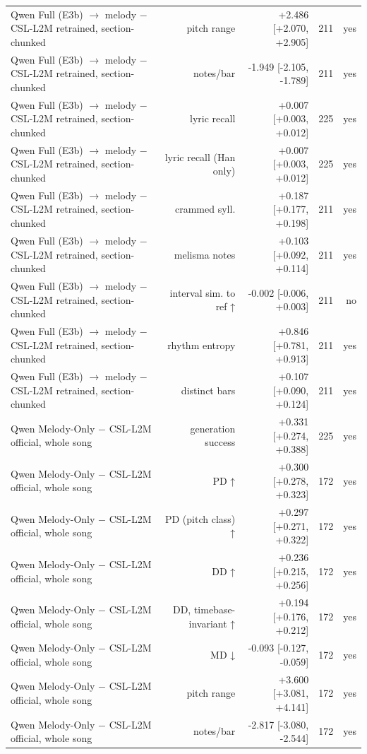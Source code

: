 \begin{table}[t]
\begin{tabular}{lrrrr}
Qwen Full (E3b) $\rightarrow$ melody $-$ CSL-L2M retrained, section-chunked & pitch range & +2.486 [+2.070, +2.905] & 211 & yes \\
Qwen Full (E3b) $\rightarrow$ melody $-$ CSL-L2M retrained, section-chunked & notes/bar & -1.949 [-2.105, -1.789] & 211 & yes \\
Qwen Full (E3b) $\rightarrow$ melody $-$ CSL-L2M retrained, section-chunked & lyric recall & +0.007 [+0.003, +0.012] & 225 & yes \\
Qwen Full (E3b) $\rightarrow$ melody $-$ CSL-L2M retrained, section-chunked & lyric recall (Han only) & +0.007 [+0.003, +0.012] & 225 & yes \\
Qwen Full (E3b) $\rightarrow$ melody $-$ CSL-L2M retrained, section-chunked & crammed syll. & +0.187 [+0.177, +0.198] & 211 & yes \\
Qwen Full (E3b) $\rightarrow$ melody $-$ CSL-L2M retrained, section-chunked & melisma notes & +0.103 [+0.092, +0.114] & 211 & yes \\
Qwen Full (E3b) $\rightarrow$ melody $-$ CSL-L2M retrained, section-chunked & interval sim. to ref ↑ & -0.002 [-0.006, +0.003] & 211 & no \\
Qwen Full (E3b) $\rightarrow$ melody $-$ CSL-L2M retrained, section-chunked & rhythm entropy & +0.846 [+0.781, +0.913] & 211 & yes \\
Qwen Full (E3b) $\rightarrow$ melody $-$ CSL-L2M retrained, section-chunked & distinct bars & +0.107 [+0.090, +0.124] & 211 & yes \\
Qwen Melody-Only $-$ CSL-L2M official, whole song & generation success & +0.331 [+0.274, +0.388] & 225 & yes \\
Qwen Melody-Only $-$ CSL-L2M official, whole song & PD ↑ & +0.300 [+0.278, +0.323] & 172 & yes \\
Qwen Melody-Only $-$ CSL-L2M official, whole song & PD (pitch class) ↑ & +0.297 [+0.271, +0.322] & 172 & yes \\
Qwen Melody-Only $-$ CSL-L2M official, whole song & DD ↑ & +0.236 [+0.215, +0.256] & 172 & yes \\
Qwen Melody-Only $-$ CSL-L2M official, whole song & DD, timebase-invariant ↑ & +0.194 [+0.176, +0.212] & 172 & yes \\
Qwen Melody-Only $-$ CSL-L2M official, whole song & MD ↓ & -0.093 [-0.127, -0.059] & 172 & yes \\
Qwen Melody-Only $-$ CSL-L2M official, whole song & pitch range & +3.600 [+3.081, +4.141] & 172 & yes \\
Qwen Melody-Only $-$ CSL-L2M official, whole song & notes/bar & -2.817 [-3.080, -2.544] & 172 & yes \\

\end{tabular}
\end{table}
